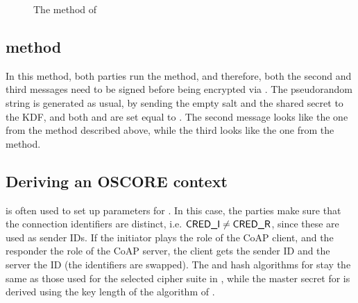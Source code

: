 {\begin{figure}[!h]
{}
\caption{The \mStatSig{} method of \mEdhoc}
\label{fig:edhocstatsig}
\end{figure}

\subsection{\mSigSig{} method}
In this method, both parties run the \mSig{} method, and therefore, both the second and third messages need to be signed before being encrypted via \mAead. The pseudorandom string \mPRKtwo is generated as usual, by sending the empty salt and the shared secret to the KDF, and both \mPRKthree and \mPRKfour are set equal to \mPRKtwo. The second message looks like the one from the \mSigStat{} method described above, while the third looks like the one from the \mStatSig{} method.

\subsection{Deriving an OSCORE context}
\mEdhoc{} is often used to set up parameters for \mOscore. In this case, the parties make sure that the connection identifiers are distinct, i.e. $\text{\textup{\textsf{CRED\_I}}} \neq \text{\textup{\textsf{CRED\_R}}}$, since these are used as \mOscore{} sender IDs. If the initiator plays the role of the CoAP client, and the responder the role of the CoAP server, the client gets the sender ID \mCredr and the server the ID \mCredi (the identifiers are swapped). The \mAead{} and hash algorithms for \mOscore{} stay the same as those used for the selected cipher suite in \mEdhoc, while the master secret for \mOscore{} is derived using the key length of the \mAead{} algorithm of \mEdhoc. 

}
